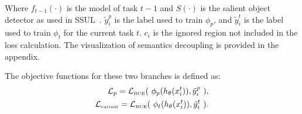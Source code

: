 Where \(f_{t-1}(\cdot)\) is the model of task $t-1$ and \( S(\cdot) \) is the salient object detector as used in SSUL~\citep{SSUL_cha2021ssul}. \(\tilde{y}_{i}^{p}\) is the label used to train \(\phi_p\), and \(\tilde{y}_{i}^{t}\) is the label used to train \(\phi_t\) for the current task \( t \). \(c_i\) is the ignored region not included in the loss calculation. The visualization of semantics decoupling is provided in the appendix. 


The objective functions for these two branches is defined as:
\begin{equation}
    \begin{aligned}
    \mathcal{L}_{p} = \mathcal{L}_{\text{\tiny BCE}}(~\phi_p(h_\theta(x_i^t)), \tilde{y}_i^p ~), \\
    \mathcal{L}_{\text{\tiny current}} = \mathcal{L}_{\text{\tiny BCE}}(~\phi_t(h_\theta(x_i^t)), \tilde{y}_i^t~).
    \end{aligned}
\end{equation}


